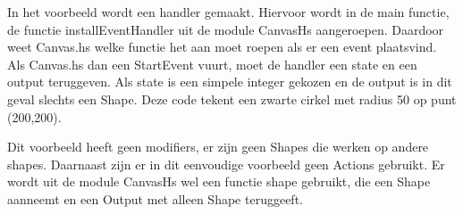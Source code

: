 

In het voorbeeld wordt een handler gemaakt. Hiervoor wordt in de main functie, de functie installEventHandler uit de module CanvasHs aangeroepen. Daardoor weet Canvas.hs welke functie het aan moet roepen als er een event plaatsvind. Als Canvas.hs dan een StartEvent vuurt, moet de handler een state en een output teruggeven. Als state is een simpele integer gekozen en de output is in dit geval slechts een Shape. Deze code tekent een zwarte cirkel met radius 50 op punt (200,200).

Dit voorbeeld heeft geen modifiers, er zijn geen Shapes die werken op andere shapes. Daarnaast zijn er in dit eenvoudige voorbeeld geen Actions gebruikt. Er wordt uit de module CanvasHs wel een functie shape gebruikt, die een Shape aanneemt en een Output met alleen Shape teruggeeft.